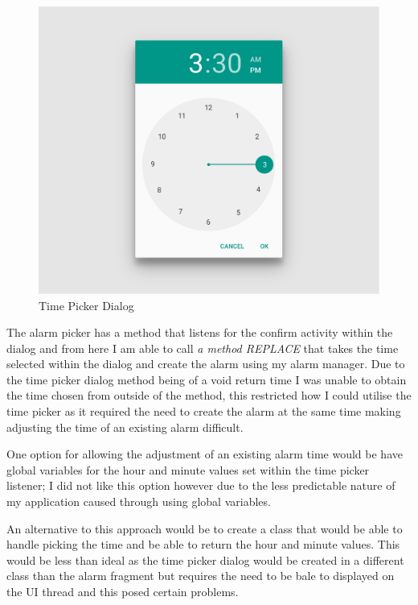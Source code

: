 \begin{center}
  \begin{figure}
    \includegraphics[scale=0.20,keepaspectratio]{Images/components_pickers_time.png}
    \caption{Time Picker Dialog}
  \end{figure}
\end{center}

The alarm picker has a method that listens for the confirm activity
within the dialog and from here I am able to call \emph{a method
REPLACE} that takes the time selected within the dialog and create the
alarm using my alarm manager. Due to the time picker dialog method being
of a void return time I was unable to obtain the time chosen from
outside of the method, this restricted how I could utilise the time
picker as it required the need to create the alarm at the same time
making adjusting the time of an existing alarm difficult.

One option for allowing the adjustment of an existing alarm time would
be have global variables for the hour and minute values set within the
time picker listener; I did not like this option however due to the less
predictable nature of my application caused through using global
variables.

An alternative to this approach would be to create a class that would be
able to handle picking the time and be able to return the hour and
minute values. This would be less than ideal as the time picker dialog
would be created in a different class than the alarm fragment but
requires the need to be bale to displayed on the UI thread and this
posed certain problems.

